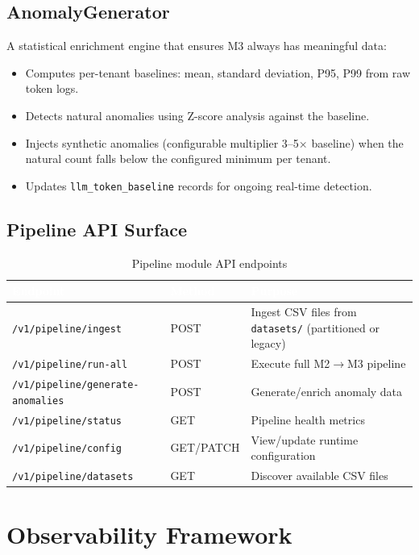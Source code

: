 \documentclass[12pt,a4paper,twoside]{report}
\begin{document}
\subsection{AnomalyGenerator}

A statistical enrichment engine that ensures M3 always has meaningful data:
\begin{itemize}
  \item Computes per-tenant baselines: mean, standard deviation, P95, P99 from raw token logs.
  \item Detects natural anomalies using Z-score analysis against the baseline.
  \item Injects synthetic anomalies (configurable multiplier 3--5$\times$ baseline) when the natural count falls below the configured minimum per tenant.
  \item Updates \texttt{llm\_token\_baseline} records for ongoing real-time detection.
\end{itemize}

\subsection{Pipeline API Surface}

\begin{table}[H]
\centering
\small
\begin{tabularx}{\textwidth}{|l|l|X|}
\hline
\rowcolor{tabheader}
\textcolor{white}{\textbf{Endpoint}} &
\textcolor{white}{\textbf{Method}} &
\textcolor{white}{\textbf{Purpose}} \\
\hline
\texttt{/v1/pipeline/ingest} & POST & Ingest CSV files from \texttt{datasets/} (partitioned or legacy) \\
\hline
\texttt{/v1/pipeline/run-all} & POST & Execute full M2$\rightarrow$M3 pipeline \\
\hline
\texttt{/v1/pipeline/generate-anomalies} & POST & Generate/enrich anomaly data \\
\hline
\texttt{/v1/pipeline/status} & GET & Pipeline health metrics \\
\hline
\texttt{/v1/pipeline/config} & GET/PATCH & View/update runtime configuration \\
\hline
\texttt{/v1/pipeline/datasets} & GET & Discover available CSV files \\
\hline
\end{tabularx}
\caption{Pipeline module API endpoints}
\end{table}

\section{Observability Framework}
\label{sec:observability}
\end{document}
